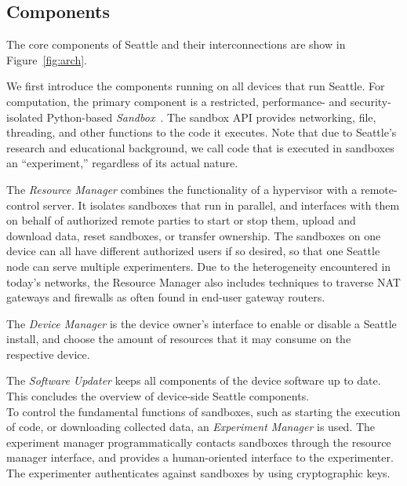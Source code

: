 \subsection{Components}\label{sec-components}

The core components of Seattle and their interconnections are
show in Figure~\ref{fig:arch}.

We first introduce the components running on all devices that
run Seattle.
For computation, the primary component is a restricted,
performance- and security-isolated Python-based
\textit{Sandbox}~\cite{RepySandbox,li2015fence}.
The sandbox \gls{API} provides
networking, file, threading, and other functions to
the code it executes. Note that
due to Seattle's research and educational background, we
call code that is executed in sandboxes an ``experiment,''
regardless of its actual nature.

The \textit{Resource Manager} combines the functionality of
a hypervisor with a remote-control server.
It isolates %
sandboxes that run in
parallel, and interfaces with them on behalf of authorized remote
parties to start or stop them, upload and download data, reset
sandboxes, or transfer ownership. The sandboxes on one
device can all have different authorized users if so desired,
so that one Seattle node can serve multiple experimenters.
Due to the heterogeneity encountered in today's networks,
the Resource Manager also includes techniques to traverse
\gls{NAT} gateways and firewalls as often found in end-user
gateway routers.

The \textit{Device Manager} %
is the device owner's interface to enable or disable a Seattle
install, and choose the amount of resources that it may consume on the respective
device.

The \textit{Software Updater} keeps all components of the
device software up to date. This concludes the overview of
device-side Seattle components.
\\

To control the fundamental functions of sandboxes, such as
starting the execution of code, or downloading collected data,
an \textit{Experiment Manager} %
is used. The experiment manager programmatically contacts sandboxes
through the resource manager interface, and provides a
human-oriented interface to the experimenter. The experimenter
authenticates against sandboxes by using cryptographic keys.

